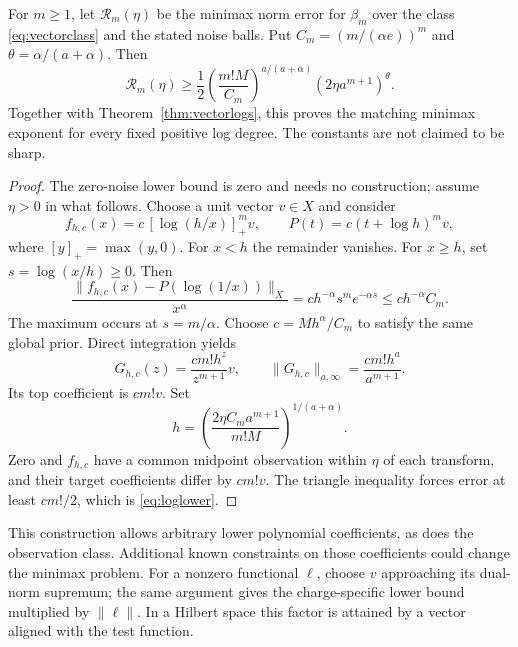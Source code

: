 \begin{theorem}
\label{thm:loglower}
For $m\ge1$, let $\mathcal R_m(\eta)$ be the minimax norm error
for $\beta_m$ over the class \eqref{eq:vectorclass} and the stated
noise balls. Put $C_m=(m/(\alpha e))^m$ and
$\theta=\alpha/(a+\alpha)$. Then
\begin{equation}\label{eq:loglower}
 \mathcal R_m(\eta)\ge\frac12
 \left(\frac{m!M}{C_m}\right)^{a/(a+\alpha)}
 (2\eta a^{m+1})^\theta.
\end{equation}
Together with Theorem~\ref{thm:vectorlogs}, this proves the matching
minimax exponent for every fixed positive log degree. The constants
are not claimed to be sharp.
\end{theorem}
\begin{proof}
The zero-noise lower bound is zero and needs no construction; assume
$\eta>0$ in what follows.
Choose a unit vector $v\in X$ and consider
\[
 f_{h,c}(x)=c\,[\log(h/x)]_+^m v,
 \qquad P(t)=c(t+\log h)^m v,
\]
where $[y]_+=\max(y,0)$. For $x<h$ the remainder vanishes. For
$x\ge h$, set $s=\log(x/h)\ge0$. Then
\[
 \frac{\|f_{h,c}(x)-P(\log(1/x))\|_X}{x^\alpha}
 =ch^{-\alpha}s^me^{-\alpha s}\le ch^{-\alpha}C_m.
\]
The maximum occurs at $s=m/\alpha$.
Choose $c=Mh^\alpha/C_m$ to satisfy the same global prior.
Direct integration yields
\[
 G_{h,c}(z)=\frac{cm!h^z}{z^{m+1}}v,\qquad
 \|G_{h,c}\|_{a,\infty}=\frac{cm!h^a}{a^{m+1}}.
\]
Its top coefficient is $cm!v$. Set
\[
 h=\left(\frac{2\eta C_ma^{m+1}}{m!M}\right)^{1/(a+\alpha)}.
\]
Zero and $f_{h,c}$ have a common midpoint observation within
$\eta$ of each transform, and their target coefficients differ by
$cm!v$. The triangle inequality forces error at least $cm!/2$,
which is \eqref{eq:loglower}.
\end{proof}

This construction allows arbitrary lower polynomial coefficients,
as does the observation class. Additional known constraints on those
coefficients could change the minimax problem. For a nonzero functional
$\ell$, choose $v$ approaching its dual-norm supremum; the same argument
gives the charge-specific lower bound multiplied by $\|\ell\|$.
In a Hilbert space this factor is attained by a vector aligned with
the test function.

